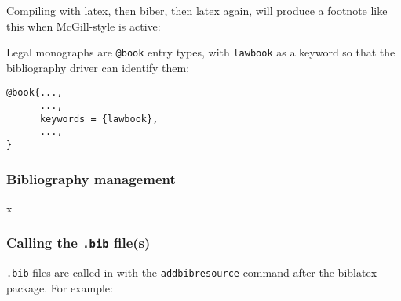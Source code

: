 Compiling with latex, then biber, then latex again, will produce a footnote like this when McGill-style is active:

\bigskip
{}


\bigskip
Legal monographs are \texttt{@book} entry types, with \texttt{lawbook} as a keyword so that the bibliography driver can identify them:

\begin{verbatim}
@book{...,
      ...,
      keywords = {lawbook},
      ...,
}
\end{verbatim}




\subsubsection{Bibliography management}
x
\subsubsection{Calling the \texttt{.bib} file(s)}
\texttt{.bib} files are called in with the \texttt{addbibresource} command after the biblatex package. For example:
\begin{verbatim}


\end{verbatim}


